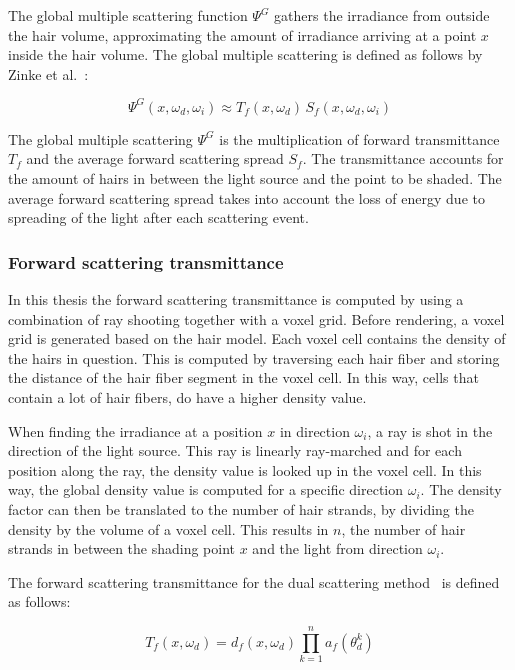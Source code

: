 The global multiple scattering function $\Psi^G$ gathers the irradiance from outside the hair volume, approximating the amount of irradiance arriving at a point $x$ inside the hair volume. The global multiple scattering is defined as follows by Zinke et al.~\cite{zinke}:

\begin{equation}
\Psi^G(x, \omega_d, \omega_i) \approx T_f(x, \omega_d)\,S_f(x, \omega_d, \omega_i)
\end{equation}

The global multiple scattering $\Psi^G$ is the multiplication of forward transmittance $T_f$ and the average forward scattering spread $S_f$. The transmittance accounts for the amount of hairs in between the light source and the point to be shaded. The average forward scattering spread takes into account the loss of energy due to spreading of the light after each scattering event.

\subsubsection{Forward scattering transmittance}

In this thesis the forward scattering transmittance is computed by using a combination of ray shooting together with a voxel grid. Before rendering, a voxel grid is generated based on the hair model. Each voxel cell contains the density of the hairs in question. This is computed by traversing each hair fiber and storing the distance of the hair fiber segment in the voxel cell. In this way, cells that contain a lot of hair fibers, do have a higher density value.

When finding the irradiance at a position $x$ in direction $\omega_i$, a ray is shot in the direction of the light source. This ray is linearly ray-marched and for each position along the ray, the density value is looked up in the voxel cell. In this way, the global density value is computed for a specific direction $\omega_i$. The density factor can then be translated to the number of hair strands, by dividing the density by the volume of a voxel cell. This results in $n$, the number of hair strands in between the shading point $x$ and the light from direction $\omega_i$.

The forward scattering transmittance for the dual scattering method~\cite{zinke} is defined as follows:

\begin{equation}
T_f(x, \omega_d) = d_f(x, \omega_d) \prod_{k=1}^{n} a_f(\theta_d^k)
\label{dualscattering_Tf}
\end{equation}


